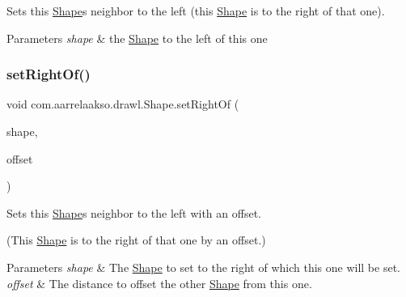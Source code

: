 Sets this \hyperlink{classcom_1_1aarrelaakso_1_1drawl_1_1_shape}{Shape}\textquotesingle{}s neighbor to the left (this \hyperlink{classcom_1_1aarrelaakso_1_1drawl_1_1_shape}{Shape} is to the right of that one). 


\begin{DoxyParams}{Parameters}
{\em shape} & the \hyperlink{classcom_1_1aarrelaakso_1_1drawl_1_1_shape}{Shape} to the left of this one \\
\hline
\end{DoxyParams}
\mbox{\label{classcom_1_1aarrelaakso_1_1drawl_1_1_shape_a6be6bb2859ccc4fd6e55e85aac5ec255}} 
\subsubsection{\texorpdfstring{set\+Right\+Of()}{setRightOf()}\hspace{0.1cm}{\footnotesize\ttfamily [2/2]}}
{\footnotesize\ttfamily void com.\+aarrelaakso.\+drawl.\+Shape.\+set\+Right\+Of (\begin{DoxyParamCaption}\item[{@Not\+Null \hyperlink{classcom_1_1aarrelaakso_1_1drawl_1_1_shape}{Shape}}]{shape,  }\item[{@Not\+Null \hyperlink{classcom_1_1aarrelaakso_1_1drawl_1_1_measure}{Measure}}]{offset }\end{DoxyParamCaption})\hspace{0.3cm}{\ttfamily [inherited]}}



Sets this \hyperlink{classcom_1_1aarrelaakso_1_1drawl_1_1_shape}{Shape}\textquotesingle{}s neighbor to the left with an offset. 

(This \hyperlink{classcom_1_1aarrelaakso_1_1drawl_1_1_shape}{Shape} is to the right of that one by an offset.)


\begin{DoxyParams}{Parameters}
{\em shape} & The \hyperlink{classcom_1_1aarrelaakso_1_1drawl_1_1_shape}{Shape} to set to the right of which this one will be set. \\
\hline
{\em offset} & The distance to offset the other \hyperlink{classcom_1_1aarrelaakso_1_1drawl_1_1_shape}{Shape} from this one. \\
\hline
\end{DoxyParams}
\mbox{\label{classcom_1_1aarrelaakso_1_1drawl_1_1_shape_a3930f6fe72f6c5e0c0aa4c25ffbf18ff}} 
